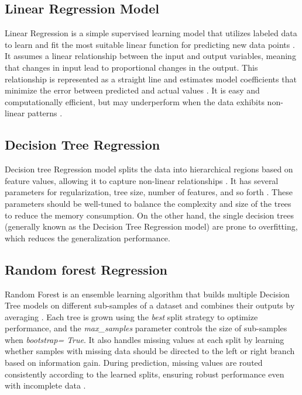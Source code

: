 \documentclass[conference]{IEEEtran}
\begin{document}
\subsection{Linear Regression Model}
Linear Regression is a simple supervised learning model that utilizes labeled data to learn and fit the most suitable linear function for predicting new data points \cite{geron2022hands}. It assumes a linear relationship between the input and output variables, meaning that changes in input lead to proportional changes in the output. This relationship is represented as a straight line and estimates model coefficients that minimize the error between predicted and actual values \cite{linearregression}. It is easy and computationally efficient, but may underperform when the data exhibits non-linear patterns \cite{geron2022hands}.  

\subsection{Decision Tree Regression}
Decision tree Regression model splits the data into hierarchical regions based on feature values, allowing it to capture non-linear relationships \cite{geron2022hands}. It has several parameters for regularization, tree size, number of features, and so forth \cite{decisiontreereg}. These parameters should be well-tuned to balance the complexity and size of the trees to reduce the memory consumption. On the other hand, the single decision trees (generally known as the Decision Tree Regression model) are prone to overfitting, which reduces the generalization performance. 

\subsection{Random forest Regression}
Random Forest is an ensemble learning algorithm that builds multiple Decision Tree models on different sub-samples of a dataset and combines their outputs by averaging \cite{geron2022hands}. Each tree is grown using the \textit{best} split strategy to optimize performance, and the \textit{max\_samples} parameter controls the size of sub-samples when \textit{bootstrap= True}. It also handles missing values at each split by learning whether samples with missing data should be directed to the left or right branch based on information gain. During prediction, missing values are routed consistently according to the learned splits, ensuring robust performance even with incomplete data \cite{randomforestreg}.
\end{document}
